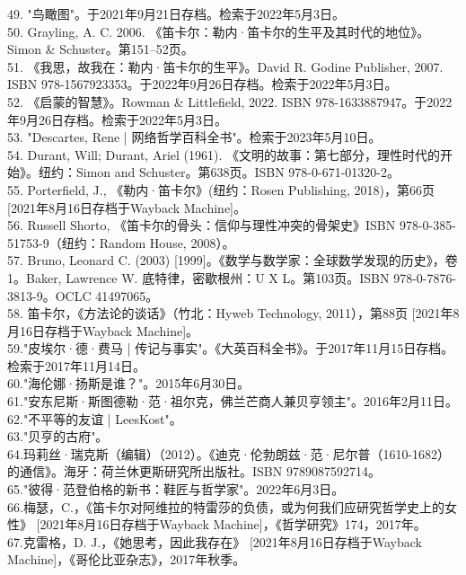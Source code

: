 49. "鸟瞰图"。于2021年9月21日存档。检索于2022年5月3日。\\
50. Grayling, A. C. 2006. 《笛卡尔：勒内·笛卡尔的生平及其时代的地位》。Simon & Schuster。第151–52页。\\
51. 《我思，故我在：勒内·笛卡尔的生平》。David R. Godine Publisher, 2007. ISBN 978-1567923353。于2022年9月26日存档。检索于2022年5月3日。\\
52. 《启蒙的智慧》。Rowman & Littlefield, 2022. ISBN 978-1633887947。于2022年9月26日存档。检索于2022年5月3日。\\
53. "Descartes, Rene | 网络哲学百科全书"。检索于2023年5月10日。\\
54. Durant, Will; Durant, Ariel (1961). 《文明的故事：第七部分，理性时代的开始》。纽约：Simon and Schuster。第638页。ISBN 978-0-671-01320-2。\\
55. Porterfield, J., 《勒内·笛卡尔》(纽约：Rosen Publishing, 2018)，第66页 [2021年8月16日存档于Wayback Machine]。\\
56. Russell Shorto, 《笛卡尔的骨头：信仰与理性冲突的骨架史》ISBN 978-0-385-51753-9（纽约：Random House, 2008）。\\
57. Bruno, Leonard C. (2003) [1999]。《数学与数学家：全球数学发现的历史》，卷1。Baker, Lawrence W. 底特律，密歇根州：U X L。第103页。ISBN 978-0-7876-3813-9。OCLC 41497065。\\
58. 笛卡尔，《方法论的谈话》（竹北：Hyweb Technology, 2011），第88页 [2021年8月16日存档于Wayback Machine]。\\
59."皮埃尔·德·费马 | 传记与事实"。《大英百科全书》。于2017年11月15日存档。检索于2017年11月14日。\\
60."海伦娜·扬斯是谁？"。2015年6月30日。\\
61."安东尼斯·斯图德勒·范·祖尔克，佛兰芒商人兼贝亨领主"。2016年2月11日。\\
62."不平等的友谊 | LeesKost"。\\
63."贝亨的古府"。\\
64.玛莉丝·瑞克斯（编辑）（2012）。《迪克·伦勃朗兹·范·尼尔普（1610-1682）的通信》。海牙：荷兰休更斯研究所出版社。ISBN 9789087592714。\\
65."彼得·范登伯格的新书：鞋匠与哲学家"。2022年6月3日。\\
66.梅瑟，C.，《笛卡尔对阿维拉的特雷莎的负债，或为何我们应研究哲学史上的女性》 [2021年8月16日存档于Wayback Machine]，《哲学研究》174，2017年。\\
67.克雷格，D. J.，《她思考，因此我存在》 [2021年8月16日存档于Wayback Machine]，《哥伦比亚杂志》，2017年秋季。\\
